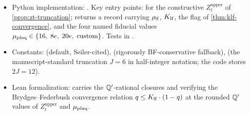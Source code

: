 \begin{itemize}
  \item Python implementation:
    .  Key entry points:
     for the
    constructive $Z_t^{\mathrm{upper}}$ of \cref{prop:zt-truncation};
     returns a  record carrying
    $\rho_{\mathrm{lf}}$, $K_{\mathrm{lf}}$, the  flag of
    \cref{thm:klf-convergence}, and the four named fiducial values
    $\mu_{\mathrm{plaq}} \in \{16,\; 8e,\; 20e,\; \text{custom}\}$.
    Tests in .
  \item Constants:
     (default,
    Seiler-cited),
    (rigorously BF-conservative fallback),
     (the manuscript-standard
    truncation $J = 6$ in half-integer notation; the code stores
    $2J = 12$).
  \item Lean formalization: 
    carries the $\mathbb{Q}'$-rational closures
     and
     verifying the
    Brydges--Federbush convergence relation $q \le K_{\mathrm{lf}} \cdot
    (1 - q)$ at the rounded $\mathbb{Q}'$ values of $Z_t^{\mathrm{upper}}$
    and $\mu_{\mathrm{plaq}}$.
\end{itemize}
